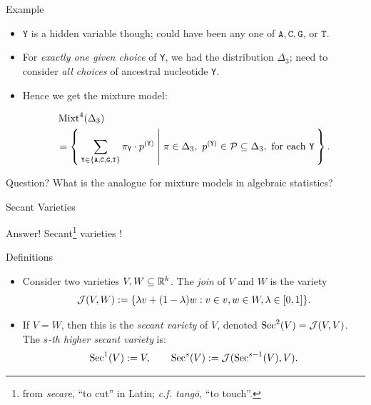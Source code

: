 \begin{frame}{Example}
    \begin{itemize}
        \item  $\texttt{Y}$ is a hidden variable though; could have been any one of $\texttt{A}, \texttt{C}, \texttt{G}$, or $\texttt{T}$.

        \item For \emph{exactly one given choice} of \texttt{Y}, we had the distribution $\Delta_{3}$; need to consider \emph{all choices} of ancestral nucleotide \texttt{Y}.

        \item Hence we get the mixture model:

        \begin{equation*}
            \begin{split}
                &\operatorname{Mixt}^{4}(\Delta_{3}) \\
                &= \Set{\sum_{ \texttt{Y} \in \{ \texttt{A}, \texttt{C}, \texttt{G}, \texttt{T} \}  } \pi_{\texttt{Y}} \cdot p^{(\texttt{Y})} | \pi \in \Delta_{3},\ p^{(\texttt{Y})} \in \mathcal{P} \subseteq \Delta_{3}, \text{ for each \texttt{Y}} }.
            \end{split}
        \end{equation*}

    \end{itemize}

    \begin{block}{Question?}
    What is the analogue for mixture models in algebraic statistics?
    \end{block}

\end{frame}

\begin{frame}{Secant Varieties}
    \begin{block}{Answer!}
        Secant\footnote{from \emph{secare}, ``to cut'' in Latin; \emph{c.f. tangō}, ``to touch''.} varieties \cite{BSSSMD2009}!
    \end{block}

    \begin{block}{Definitions}
        \begin{itemize}
        \item Consider two varieties $V, W \subseteq \mathbb{R}^{k}$. The \emph{join} of $V$ and $W$ is the variety
        $$ \mathcal{J}(V,W) := \{ \lambda v + (1-\lambda)w : v \in v, w \in W, \lambda \in [0,1] \}. $$

        \item If $V = W$, then this is the \emph{secant variety} of $V$, denoted $\operatorname{Sec}^{2}(V) = \mathcal{J}(V,V)$. The \emph{$s$-th higher secant variety} is:
        $$ \operatorname{Sec}^{1}(V) := V, \qquad \operatorname{Sec}^{s}(V) := \mathcal{J}(\operatorname{Sec}^{s-1}(V), V ). $$
        \end{itemize}
    \end{block}

\end{frame}

